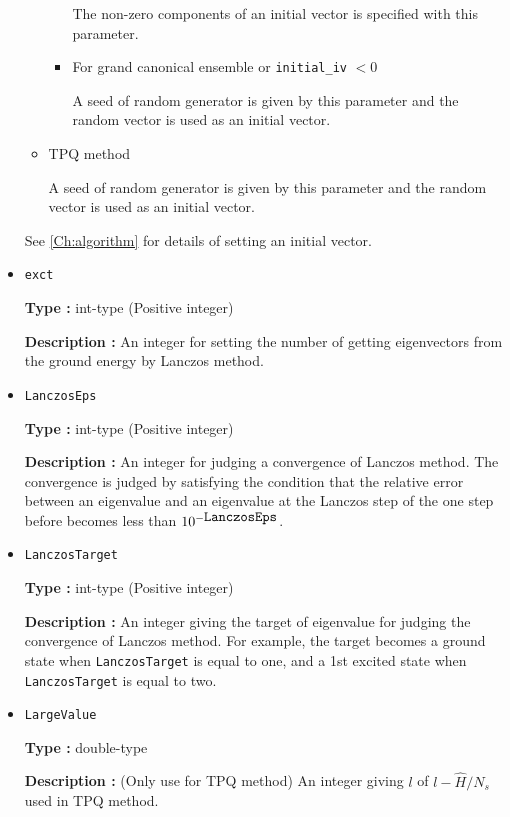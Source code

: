 \begin{itemize}
\begin{itemize}
\begin{itemize}
The non-zero components of an initial vector is specified with this parameter. 

\item{For grand canonical ensemble or \verb|initial_iv| $< 0$}

A seed of random generator is given by this parameter and the random vector is used as an initial vector.
\end{itemize}

\item{TPQ method}

A seed of random generator is given by this parameter and the random vector is used as an initial vector.
\end{itemize}
See \ref{Ch:algorithm} for details of setting an initial vector.

 \item  \verb|exct|

{\bf Type :} int-type (Positive integer)

{\bf Description :} 
 An integer for setting the number of getting eigenvectors from the ground energy by Lanczos method.\\

\item   \verb|LanczosEps|
   
{\bf Type :} int-type (Positive integer)

{\bf Description :} An integer for judging a convergence of Lanczos method. The convergence is judged by satisfying the condition that the relative error between an eigenvalue and an eigenvalue at the Lanczos step of the one step before becomes less than $10^{- \verb|LanczosEps|}$.

 \item  \verb|LanczosTarget| 
   
 {\bf Type :} int-type (Positive integer)

  {\bf Description :} An integer giving the target of eigenvalue for judging the convergence of Lanczos method. For example, the target becomes a ground state when \verb|LanczosTarget|  is equal to one, and a 1st excited state when  \verb|LanczosTarget|  is equal to two.
     
\item \verb|LargeValue|

{\bf Type :} double-type

{\bf Description :} (Only use for TPQ method) An integer giving $l$ of $l-\hat{H}/N_{s}$ used in TPQ method.
 

\end{itemize}
